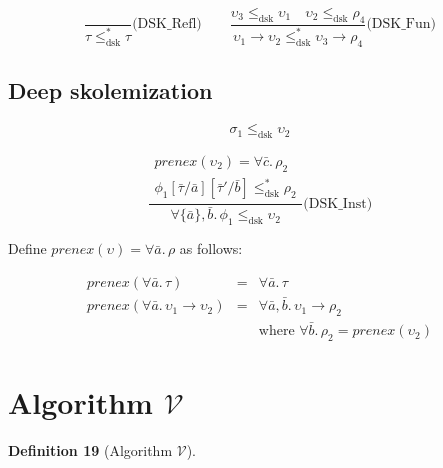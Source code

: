 \documentclass{article}
\begin{document}
\[
\frac{}{\tau \leq_{\mathrm{dsk}}^{*} \tau}\text{(DSK\_Refl)}
\qquad
\frac{\upsilon_3 \leq_{\mathrm{dsk}} \upsilon_1 \quad \upsilon_2 \leq_{\mathrm{dsk}} \rho_4}{\upsilon_1 \to \upsilon_2 \leq_{\mathrm{dsk}}^{*} \upsilon_3 \to \rho_4}\text{(DSK\_Fun)}
\]

\subsection*{Deep skolemization}

\[
\boxed{\sigma_1 \leq_{\mathrm{dsk}} \upsilon_2}
\]

\[
\frac{\begin{array}{c}
\mathit{prenex}(\upsilon_2) = \forall \bar{c}.\, \rho_2 \\
\phi_1[\bar{\tau}/\bar{a}][\bar{\tau}'/\bar{b}] \leq_{\mathrm{dsk}}^{*} \rho_2
\end{array}}{\forall\{\bar{a}\}, \bar{b}.\, \phi_1 \leq_{\mathrm{dsk}} \upsilon_2}\text{(DSK\_Inst)}
\]

Define $\mathit{prenex}(\upsilon) = \forall \bar{a}.\, \rho$ as follows:

\[
\begin{array}{rcl}
\mathit{prenex}(\forall \bar{a}.\, \tau) & = & \forall \bar{a}.\, \tau \\
\mathit{prenex}(\forall \bar{a}.\, \upsilon_1 \to \upsilon_2) & = & \forall \bar{a}, \bar{b}.\, \upsilon_1 \to \rho_2 \\
& & \text{where } \forall \bar{b}.\, \rho_2 = \mathit{prenex}(\upsilon_2)
\end{array}
\]

\section*{Algorithm $\mathcal{V}$}

\textbf{Definition 19} (Algorithm $\mathcal{V}$).
\end{document}
